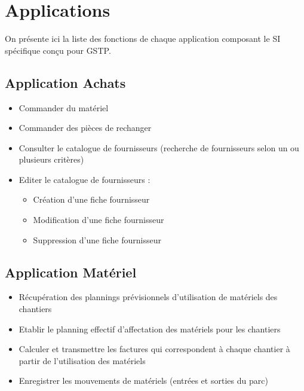 \documentclass [a4paper] {report}
\begin{document}
\section{Applications}

On présente ici la liste des fonctions de chaque application composant le
SI spécifique conçu pour GSTP.


\subsection{Application Achats}
\begin{itemize}
\item Commander du matériel
\item Commander des pièces de rechanger
\item Consulter le catalogue de fournisseurs (recherche de fournisseurs selon 
un ou plusieurs critères)
\item Editer le catalogue de fournisseurs :
	\begin{itemize}
	\item Création d'une fiche fournisseur
	\item Modification d'une fiche fournisseur
	\item Suppression d'une fiche fournisseur
	\end{itemize}
\end{itemize}

\subsection{Application Matériel}
\begin{itemize}
\item Récupération des plannings prévisionnels d'utilisation de matériels des chantiers
\item Etablir le planning effectif d'affectation des matériels pour les chantiers
\item Calculer et transmettre les factures qui correspondent à chaque chantier
à partir de l'utilisation des matériels
\item Enregistrer les mouvements de matériels (entrées et sorties du parc)
\end{itemize}
\end{document}
